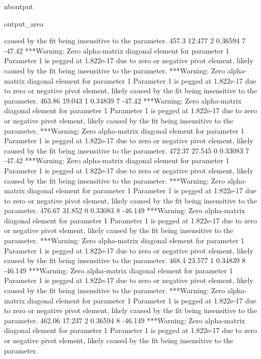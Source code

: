 \documentclass[letterpaper,10pt,english]{sphinxmanual}
\begin{document}
\begin{sphinxuseclass}{nboutput}
{\begin{sphinxuseclass}{output_area}
\begin{sphinxuseclass}{}
\begin{sphinxVerbatim}[commandchars=\\\{\}]
 caused by the fit being insensitive to the parameter.
           457.3      12.477    2     0.36594    7      -47.42
***Warning: Zero alpha-matrix diagonal element for parameter 1
 Parameter 1 is pegged at 1.822e-17 due to zero or negative pivot element, likely
 caused by the fit being insensitive to the parameter.
***Warning: Zero alpha-matrix diagonal element for parameter 1
 Parameter 1 is pegged at 1.822e-17 due to zero or negative pivot element, likely
 caused by the fit being insensitive to the parameter.
          463.86      19.043    1     0.34839    7      -47.42
***Warning: Zero alpha-matrix diagonal element for parameter 1
 Parameter 1 is pegged at 1.822e-17 due to zero or negative pivot element, likely
 caused by the fit being insensitive to the parameter.
***Warning: Zero alpha-matrix diagonal element for parameter 1
 Parameter 1 is pegged at 1.822e-17 due to zero or negative pivot element, likely
 caused by the fit being insensitive to the parameter.
          472.37      27.545    0     0.33083    7      -47.42
***Warning: Zero alpha-matrix diagonal element for parameter 1
 Parameter 1 is pegged at 1.822e-17 due to zero or negative pivot element, likely
 caused by the fit being insensitive to the parameter.
***Warning: Zero alpha-matrix diagonal element for parameter 1
 Parameter 1 is pegged at 1.822e-17 due to zero or negative pivot element, likely
 caused by the fit being insensitive to the parameter.
          476.67      31.852    0     0.33083    8     -46.149
***Warning: Zero alpha-matrix diagonal element for parameter 1
 Parameter 1 is pegged at 1.822e-17 due to zero or negative pivot element, likely
 caused by the fit being insensitive to the parameter.
***Warning: Zero alpha-matrix diagonal element for parameter 1
 Parameter 1 is pegged at 1.822e-17 due to zero or negative pivot element, likely
 caused by the fit being insensitive to the parameter.
           468.4      23.577    1     0.34839    8     -46.149
***Warning: Zero alpha-matrix diagonal element for parameter 1
 Parameter 1 is pegged at 1.822e-17 due to zero or negative pivot element, likely
 caused by the fit being insensitive to the parameter.
***Warning: Zero alpha-matrix diagonal element for parameter 1
 Parameter 1 is pegged at 1.822e-17 due to zero or negative pivot element, likely
 caused by the fit being insensitive to the parameter.
          462.06      17.237    2     0.36594    8     -46.149
***Warning: Zero alpha-matrix diagonal element for parameter 1
 Parameter 1 is pegged at 1.822e-17 due to zero or negative pivot element, likely
 caused by the fit being insensitive to the parameter.

\end{sphinxVerbatim}
\end{sphinxuseclass}
\end{sphinxuseclass}}
\end{sphinxuseclass}
\end{document}
